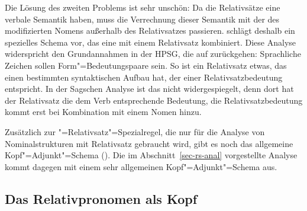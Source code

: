 
Die Lösung des zweiten Problems ist sehr unschön: Da die Relativsätze eine verbale Semantik haben,
muss die Verrechnung dieser Semantik mit der des modifizierten Nomens außerhalb des Relativsatzes
passieren. \citet[]{Sag97a} schlägt deshalb ein spezielles Schema vor, das eine \nbar mit
einem Relativsatz kombiniert. Diese Analyse widerspricht den Grundannahmen in der HPSG, die auf
\citet{Saussure16a-de} zurückgehen: Sprachliche Zeichen sollen Form"=Bedeutungspaare sein. So ist ein
Relativsatz etwas, das einen bestimmten syntaktischen Aufbau hat, der einer Relativsatzbedeutung
entspricht. In der Sagschen Analyse ist das nicht widergespiegelt, denn dort hat der Relativsatz die
dem Verb entsprechende Bedeutung, die Relativsatzbedeutung kommt erst bei Kombination mit einem
Nomen hinzu.

Zusätzlich zur \nbar"=Relativsatz"=Spezialregel, die nur für die Analyse von
Nominalstrukturen mit Relativsatz gebraucht wird, gibt es noch das allgemeine
Kopf"=Adjunkt"=Schema (). Die im Abschnitt~\ref{sec-rs-anal} vorgestellte
Analyse kommt dagegen mit einem sehr allgemeinen Kopf"=Adjunkt"=Schema aus.





\subsection{Das Relativpronomen als Kopf}


